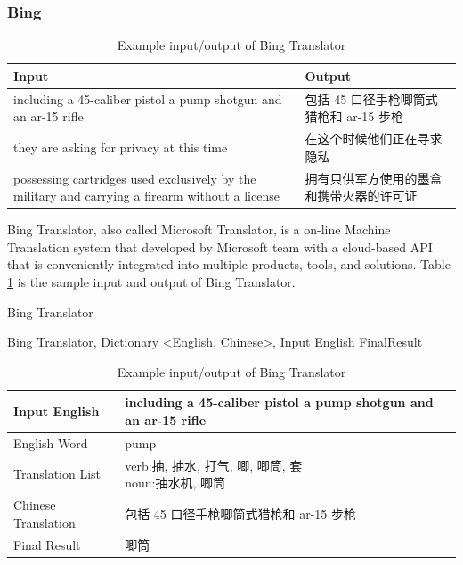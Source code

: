 \subsubsection{Bing}
\begin{table}[ht]
    \caption{Example input/output of Bing Translator}
    \label{table:bing_translator}
    \begin{tabular}{| p{4cm} | p{2.8cm} |}
        \hline
        Input & Output \\
        \hline
        including a 45-caliber pistol a pump shotgun and an ar-15 rifle & 包括 45 口径手枪唧筒式猎枪和 ar-15 步枪\\
        \hline
        they are asking for privacy at this time & 在这个时候他们正在寻求隐私\\
        \hline
        possessing cartridges used exclusively by the military and carrying a firearm without a license & 拥有只供军方使用的墨盒和携带火器的许可证\\
        \hline
    \end{tabular}
\end{table}
Bing Translator, also called Microsoft Translator, is a on-line Machine Translation system that developed by Microsoft team with a cloud-based API that is conveniently integrated into multiple products, tools, and solutions. Table \ref{table:bing_translator} is the sample input and output of Bing Translator.
\\
\begin{algorithm}[ht]
\caption{Bing Translator}
\label{algorithm:wsd_3}
\begin{algorithmic}
\REQUIRE Bing Translator, Dictionary \textless English, Chinese\textgreater, Input English
        \ENDIF
    \ENDFOR
\ENDIF
\RETURN FinalResult
\end{algorithmic}
\end{algorithm}
\begin{table}[ht]
    \caption{Example input/output of Bing Translator}
    \begin{center}
    \begin{tabular}{| p{2.5cm} | p{4cm} |}
        \hline
        Input English & including a 45-caliber pistol a pump shotgun and an ar-15 rifle\\
        \hline
        English Word & pump \\
        \hline
        Translation List & \parbox[t]{4cm}{verb:抽, 抽水, 打气, 唧, 唧筒, 套\\ noun:抽水机, 唧筒}\\
        \hline
        Chinese Translation & 包括 45 口径手枪唧筒式猎枪和 ar-15 步枪\\
        \hline
        Final Result & 唧筒\\
        \hline
    \end{tabular}
    \end{center}
\end{table}
